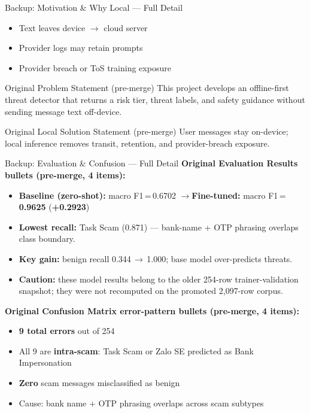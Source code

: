 \begin{frame}[allowframebreaks]{Backup: Motivation \& Why Local --- Full Detail}
\begin{itemize}
    \setlength{\itemsep}{0.2em}
    \item Text leaves device $\rightarrow$ cloud server
    \item Provider logs may retain prompts
    \item Provider breach or ToS training exposure
  \end{itemize}
  \vspace{4pt}
  \begin{block}{Original Problem Statement (pre-merge)}
    {\footnotesize This project develops an offline-first threat detector that returns a risk tier,
    threat labels, and safety guidance without sending message text off-device.}
  \end{block}
  \begin{block}{Original Local Solution Statement (pre-merge)}
    {\footnotesize User messages stay on-device; local inference removes transit, retention, and provider-breach exposure.}
  \end{block}
\end{frame}

\begin{frame}[allowframebreaks]{Backup: Evaluation \& Confusion --- Full Detail}
  {\footnotesize\textbf{Original Evaluation Results bullets (pre-merge, 4 items):}}
  \begin{itemize}\footnotesize
    \item \textbf{Baseline (zero-shot):} macro F1\,=\,0.6702 \quad$\to$\quad \textbf{Fine-tuned:} macro F1\,=\,\textcolor{CVBLUE}{\textbf{0.9625}} \quad(\textbf{+0.2923})
    \item \textbf{Lowest recall:} Task Scam (0.871) --- bank-name + OTP phrasing overlaps class boundary.
    \item \textbf{Key gain:} benign recall 0.344\,$\to$\,1.000; base model over-predicts threats.
    \item \textbf{Caution:} these model results belong to the older 254-row trainer-validation snapshot; they were not recomputed on the promoted 2{,}097-row corpus.
  \end{itemize}
  \vspace{4pt}
  {\footnotesize\textbf{Original Confusion Matrix error-pattern bullets (pre-merge, 4 items):}}
  \begin{itemize}\footnotesize
    \item \textbf{9 total errors} out of 254
    \item All 9 are \textbf{intra-scam}: Task Scam or Zalo SE predicted as Bank Impersonation
    \item \textbf{Zero} scam messages misclassified as benign
    \item Cause: bank name + OTP phrasing overlaps across scam subtypes
  \end{itemize}
\end{frame}

